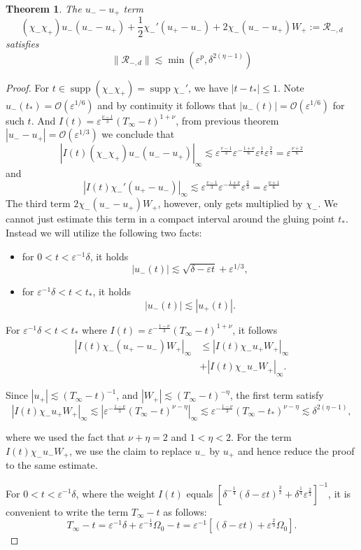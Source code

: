 \documentclass[letterpaper,11pt]{article}
\newcommand{\rmO}{\mathcal{O}}
\newcommand{\eps}{\varepsilon}
\newcommand{\lar}{ \lesssim }
\newcommand{\supp}{\operatorname{supp}}
\numberwithin{equation}{section}
\theoremstyle{plain}
\newtheorem{theorem}{Theorem}[section]
\begin{document}
\begin{enumerate}
\begin{itemize}
\begin{enumerate}
\begin{theorem}
The $u_--u_+$ term
\[
  (\chi_-\chi_+)u_-(u_--u_+) +\frac{1}{2}\chi_-'(u_+-u_-) + 2\chi_-(u_- -u_+)W_+ := \mathcal{R}_{-,d}
\]
satisfies
\[
\| \mathcal{R}_{-,d} \| \lar \min(\eps^{p}, \delta^{2(\eta-1)} )
\]
\end{theorem}
\begin{proof}
For $t\in \supp (\chi_-\chi_+) = \supp \chi_-'$, we have $|t-t_*| \le 1$. Note $u_-(t_*) = \rmO(\eps^{1/6})$ and by continuity it follows that $|u_-(t)| = \rmO(\eps^{1/6})$ for such $t$. And $I(t)=\eps^{\frac{\nu-1}{3}}(T_\infty-t)^{1+\nu}$, from previous theorem $|u_- - u_+| = \rmO(\eps^{1/3})$ we conclude that
\[
|I(t) (\chi_-\chi_+)u_-(u_--u_+)|_\infty \lar \eps^{\frac{v-1}{3}} \eps^{-\frac{1+\nu}{6}} \eps^{\frac{1}{6}}\eps^{\frac{2}{3}} = \eps^{\frac{\nu+2}{6}}
\]
 and
\[
|I(t) \chi_-'(u_+-u_-) |_\infty \lar\eps^{\frac{v-1}{3}} \eps^{-\frac{1+\nu}{6}} \eps^{\frac{2}{3}} = \eps^{\frac{\nu+1}{6}}
\]
 The third term $2\chi_-(u_- -u_+)W_+$, however, only gets multiplied by $\chi_-$. We cannot just estimate this term in a compact interval around the gluing point $t_*$. Instead we will utilize the following two facts:
\begin{itemize}
\item for $0<t<\eps^{-1}\delta$, it holds
\[
 |u_-(t)| \lar \sqrt{\delta-\eps t}+\eps^{1/3},
 \]
 \item for $\eps^{-1}\delta < t <t_*$, it holds
 \[
 |u_-(t)|\lar |u_+(t)|.
 \]
\end{itemize}

For $\eps^{-1}\delta<t<t_*$ where $I(t) = \eps^{-\frac{1-\nu}{3}} (T_\infty - t)^{1+\nu}$, it follows
\begin{align*}
|I(t)  \chi_-(u_+ - u_-)W_+|_\infty &\le |I(t) \chi_-u_+ W_+|_\infty\\
&+|I(t) \chi_-u_- W_+|_\infty.
\end{align*}
 
Since $|u_+| \lar (T_\infty -t)^{-1}$, and $|W_+| \lar (T_\infty-t)^{-\eta}$, the first term satisfy
\[
|I(t)\chi_-u_+ W_+|_\infty \lar |\eps^{-\frac{1-\nu}{3}} (T_\infty-t)^{\nu - \eta} |_\infty \lar \eps^{-\frac{1-\nu}{3}} (T_\infty-t_*)^{\nu - \eta} \lar \delta^{2(\eta-1)},
\]

where we used the fact that $\nu+\eta =2 $ and $1<\eta<2$. For the term $I(t)\chi_-u_-W_+$, we use the claim to replace $u_-$ by $u_+$ and hence reduce the proof to the same estimate.


For $0<t<\eps^{-1}\delta$, where the weight $I(t) $ equals $[\delta^{-\frac{1}{4}} (\delta -\eps t)^{\frac{3}{2}}+\delta^{\frac{1}{4}}\eps^{\frac{2}{3}}]^{-1}$, it is convenient to write the term $T_\infty -t$ as follows:
\[
T_\infty -t = \eps^{-1}\delta + \eps^{-\frac{1}{3}}\Omega_0 - t  = \eps^{-1}\left[(\delta -\eps t) +\eps^{\frac{2}{3}}\Omega_0\right].
\]


\end{proof}
\end{enumerate}
\end{itemize}
\end{enumerate}
\end{document}
